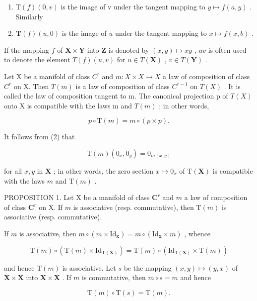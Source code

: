 \begin{enumerate}
\def\labelenumi{(\arabic{enumi})}
\setcounter{enumi}{2}
\item
  \(\mathrm{T}(f)(0,v)\) is the image of v under the tangent mapping to \(y\mapsto f(a,y)\) . Similarly
\item
  \(\mathbf{T}(f)(u,0)\) is the image of \(u\) under the tangent mapping to \(x\mapsto f(x,b)\) .
\end{enumerate}

If the mapping \(f\) of \(\mathbf{X} \times \mathbf{Y}\) into \(\mathbf{Z}\) is denoted by \((x, y) \mapsto xy\) , \(uv\) is often used to denote the element \(T(f)(u, v)\) for \(u \in T(\mathbf{X})\) , \(v \in T(\mathbf{Y})\) .

Let X be a manifold of class \(C^{r}\) and \(m: X \times X \to X\) a law of composition of class \(C^{r}\) on X. Then \(T(m)\) is a law of composition of class \(C^{r-1}\) on \(T(X)\) . It is called the law of composition tangent to m. The canonical projection p of \(T(X)\) onto X is compatible with the laws m and \(T(m)\) ; in other words,

\[
p \circ \mathrm{T} (m) = m \circ (p \times p).\tag{5}
\]

It follows from (2) that

\[
\mathrm{T} (m) \left(0 _ {x}, 0 _ {y}\right) = 0 _ {m (x, y)}\tag{6}
\]

for all \(x, y\) in \(\mathbf{X}\) ; in other words, the zero section \(x \mapsto 0_x\) of \(\mathrm{T}(\mathbf{X})\) is compatible with the laws \(m\) and \(\mathrm{T}(m)\) .

PROPOSITION 1. Let X be a manifold of class \(\mathbf{C}^r\) and \(m\) a law of composition of class \(\mathbf{C}^r\) on X. If \(m\) is associative (resp. commutative), then \(\mathrm{T}(m)\) is associative (resp. commutative).

If \(m\) is associative, then \(m \circ (m \times \mathrm{Id}_{\mathbf{x}}) = m \circ (\mathrm{Id}_{\mathbf{x}} \times m)\) , whence

\[
\mathrm{T} (m) \circ (\mathrm{T} (m) \times \mathrm{Id} _ {\mathrm{T} (\mathbf {X})}) = \mathrm{T} (m) \circ (\mathrm{Id} _ {\mathrm{T} (\mathbf {X})} \times \mathrm{T} (m))
\]

and hence \(\mathrm{T}(m)\) is associative. Let \(s\) be the mapping \((x,y)\mapsto (y,x)\) of \(\mathbf{X}\times \mathbf{X}\) into \(\mathbf{X}\times \mathbf{X}\) . If \(m\) is commutative, then \(m\circ s = m\) and hence

\[
\mathrm{T} (m) \circ \mathrm{T} (s) = \mathrm{T} (m).
\]

